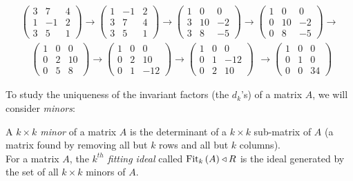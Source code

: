 \documentclass[a4paper]{article}
\begin{document}
\begin{eg}
\begin{equation*}
\begin{aligned}
\left(
\begin{matrix}
3&7&4\\
1&-1&2\\
3&5&1
\end{matrix}
\right)
\to
\left(
\begin{matrix}
1&-1&2\\
3&7&4\\
3&5&1
\end{matrix}
\right)
\to
\left(
\begin{matrix}
1&0&0\\
3&10&-2\\
3&8&-5
\end{matrix}
\right)
\to
\left(
\begin{matrix}
1&0&0\\
0&10&-2\\
0&8&-5
\end{matrix}
\right)
\to
\end{aligned}
\end{equation*}
\begin{equation*}
\begin{aligned}
\left(
\begin{matrix}
1&0&0\\
0&2&10\\
0&5&8
\end{matrix}
\right)
\to
\left(
\begin{matrix}
1&0&0\\
0&2&10\\
0&1&-12
\end{matrix}
\right)
\to
\left(
\begin{matrix}
1&0&0\\
0&1&-12\\
0&2&10
\end{matrix}
\right)
\end{aligned}
\to
\left(
\begin{matrix}
1&0&0\\
0&1&0\\
0&0&34
\end{matrix}
\right)
\end{equation*}
\end{eg}


To study the uniqueness of the invariant factors (the $d_k$'s) of a matrix $A$, we will consider \emph{minors}:

\begin{defi}
A \emph{$k\times k$ minor} of a matrix $A$ is the determinant of a $k\times k$ sub-matrix of $A$ (a matrix found by removing all but $k$ rows and all but $k$ columns).\\
For a matrix $A$, the \emph{$k^{th}$ fitting ideal} called $\operatorname{Fit}_k\left(A\right) \triangleleft R$ is the ideal generated by the set of all $k\times k$ minors of $A$.
\end{defi}
\end{document}
